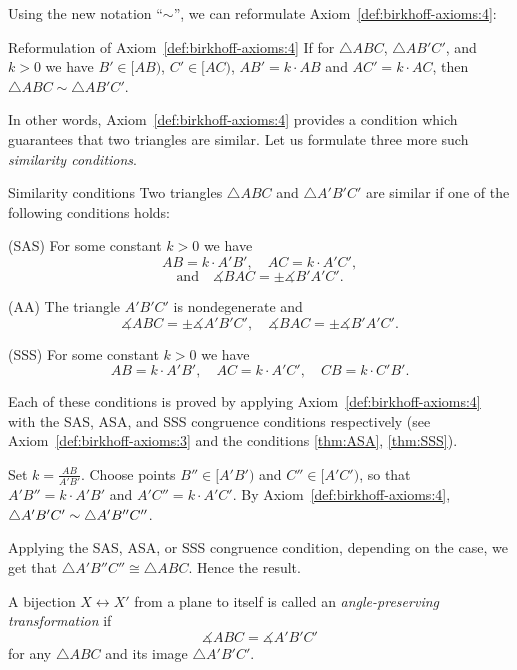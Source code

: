 Using the new notation ``$\sim$'', we can reformulate Axiom~\ref{def:birkhoff-axioms:4}:

\begin{thm}{Reformulation of Axiom~\ref{def:birkhoff-axioms:4}}
If for  
$\triangle ABC$, 
$\triangle AB'C'$,
and $k>0$ we have
$B'\in [AB)$,
$C'\in [AC)$,
$AB'=k\cdot AB$ and
$AC'=k\cdot AC$,
then $\triangle ABC\sim\triangle AB'C'$.
\end{thm}

In other words, Axiom~\ref{def:birkhoff-axioms:4} provides 
a condition which guarantees that two triangles are similar.
Let us formulate three more such {}\emph{similarity conditions}.

\begin{thm}{Similarity conditions}\label{prop:sim}
Two triangles 
$\triangle ABC$ and $\triangle A'B'C'$
are similar if one of the following conditions holds:

(SAS)
For some constant $k>0$ we have
$$A B=k\cdot A' B',
\quad 
A C=k\cdot A' C',$$
$$
\text{and}
\quad 
\measuredangle B A C=\pm\measuredangle B' A' C'.$$

(AA) The triangle $A' B' C'$ is nondegenerate
and 
$$\measuredangle A B C
=
\pm\measuredangle A' B' C',
\quad 
\measuredangle B A C
=
\pm\measuredangle B' A' C'.$$

(SSS) For some constant $k>0$ we have
$$A B=k\cdot A' B',
\quad
A C=k\cdot A' C',
\quad
CB=k\cdot C'B'.$$

\end{thm}

Each of these conditions is proved by applying Axiom~\ref{def:birkhoff-axioms:4} with the SAS, ASA, and SSS congruence conditions respectively
(see Axiom~\ref{def:birkhoff-axioms:3} and the conditions \ref{thm:ASA}, \ref{thm:SSS}).


Set $k=\tfrac{AB}{A'B'}$.
Choose points $B''\in [A'B')$ and $C''\in [A'C')$,
so that $A'B''=k\cdot A'B'$ and $A'C''=k\cdot A'C'$.
By Axiom~\ref{def:birkhoff-axioms:4},
$\triangle A'B'C'\sim \triangle A'B''C''$.

Applying the SAS, ASA, or SSS congruence condition, depending on the case, 
we get that $\triangle A'B''C''\cong \triangle ABC$.
Hence the result.
\qeds



A bijection $X\leftrightarrow X'$ from a plane to itself is called an \emph{angle-preserving transformation} if 
\[\measuredangle ABC= \measuredangle A'B'C'\]
for any $\triangle ABC$ and its image $\triangle A'B'C'$.

